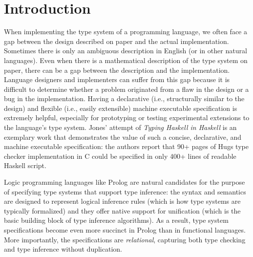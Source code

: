 \section{Introduction}\label{sec:intro}
When implementing the type system of a programming language, we often face
a gap between the design described on paper and the actual implementation.
Sometimes there is only an ambiguous description in English (or in other
natural languages). Even when there is a mathematical description of
the type system on paper, there can be a gap between the description and
the implementation. Language designers and implementers can suffer from
this gap because it is difficult to determine whether a problem originated
from a flaw in the design or a bug in the implementation.
Having a declarative (i.e., structurally similar to the design)
and flexible (i.e., easily extensible) machine executable specification
is extremely helpful, especially for prototyping or testing
experimental extensions to the language's type system.  
Jones' attempt of \emph{Typing Haskell in Haskell} \cite{JonesTHiH99} is
an exemplary work that demonstrates the value of such a concise, declarative,
and machine executable specification: the authors report that 90+ pages of
Hugs type checker implementation in C could be specified in only 400+ lines of
readable Haskell script.

Logic programming languages like Prolog are natural candidates for
the purpose of specifying type systems that support type inference:
the syntax and semantics are designed to represent logical inference rules
(which is how type systems are typically formalized) and they offer native
support for unification (which is the basic building block of type inference
algorithms). As a result, type system specifications become even more succinct
in Prolog than in functional languages. More importantly, the specifications
are \emph{relational}, capturing both type checking and type inference
without duplication.

